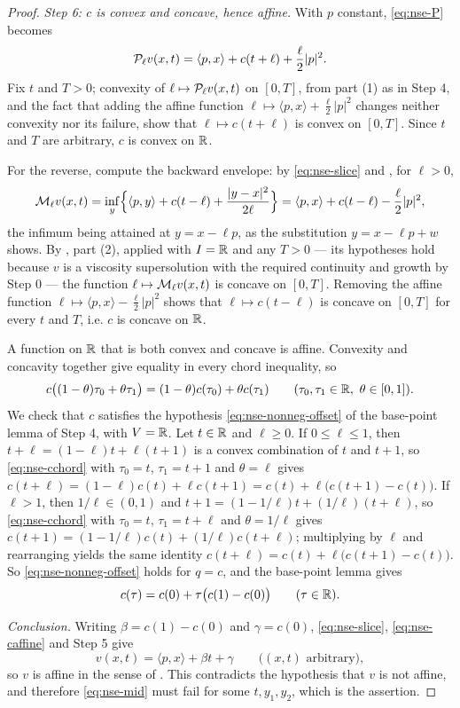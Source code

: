 \begin{proof}
\emph{Step 6: $c$ is convex and concave, hence affine.}
With $p$ constant, \eqref{eq:nse-P} becomes
\[
  \mathcal{P}_\ell v(x,t)=\langle p,x\rangle+c(t+\ell)+\frac{\ell}{2}|p|^2 .
\]
Fix $t$ and $T>0$; convexity of $\ell\mapsto\mathcal{P}_\ell v(x,t)$ on $[0,T]$, from
 part (1) as in Step 4, and the fact that adding the
affine function $\ell\mapsto\langle p,x\rangle+\tfrac\ell2|p|^2$ changes neither
convexity nor its failure, show that $\ell\mapsto c(t+\ell)$ is convex on
$[0,T]$. Since $t$ and $T$ are arbitrary, $c$ is convex on $\mathbb{R}$.

For the reverse, compute the backward envelope: by \eqref{eq:nse-slice} and
, for $\ell>0$,
\[
  \mathcal{M}_\ell v(x,t)
   =\inf_{y}\Bigl\{\langle p,y\rangle+c(t-\ell)+\frac{|y-x|^2}{2\ell}\Bigr\}
   =\langle p,x\rangle+c(t-\ell)-\frac{\ell}{2}|p|^2 ,
\]
the infimum being attained at $y=x-\ell p$, as the substitution
$y=x-\ell p+w$ shows. By , part (2), applied with
$I=\mathbb{R}$ and any $T>0$ — its hypotheses hold because $v$ is a viscosity
supersolution with the required continuity and growth by Step 0 — the function
$\ell\mapsto\mathcal{M}_\ell v(x,t)$ is concave on $[0,T]$. Removing the affine
function $\ell\mapsto\langle p,x\rangle-\tfrac\ell2|p|^2$ shows that
$\ell\mapsto c(t-\ell)$ is concave on $[0,T]$ for every $t$ and $T$, i.e. $c$ is
concave on $\mathbb{R}$.

A function on $\mathbb{R}$ that is both convex and concave is affine. Convexity and
concavity together give equality in every chord inequality, so
\begin{equation}\label{eq:nse-cchord}
  c\bigl((1-\theta)\tau_0+\theta\tau_1\bigr)
   =(1-\theta)c(\tau_0)+\theta c(\tau_1)
  \qquad(\tau_0,\tau_1\in\mathbb{R},\ \theta\in[0,1]).
\end{equation}
We check that $c$ satisfies the hypothesis \eqref{eq:nse-nonneg-offset} of the
base-point lemma of Step 4, with $V=\mathbb{R}$. Let $t\in\mathbb{R}$ and $\ell\ge0$. If
$0\le\ell\le1$, then $t+\ell=(1-\ell)t+\ell(t+1)$ is a convex combination of $t$
and $t+1$, so \eqref{eq:nse-cchord} with $\tau_0=t$, $\tau_1=t+1$ and
$\theta=\ell$ gives
$c(t+\ell)=(1-\ell)c(t)+\ell c(t+1)=c(t)+\ell\bigl(c(t+1)-c(t)\bigr)$. If
$\ell>1$, then $1/\ell\in(0,1)$ and $t+1=(1-1/\ell)t+(1/\ell)(t+\ell)$, so
\eqref{eq:nse-cchord} with $\tau_0=t$, $\tau_1=t+\ell$ and $\theta=1/\ell$ gives
$c(t+1)=(1-1/\ell)c(t)+(1/\ell)c(t+\ell)$; multiplying by $\ell$ and rearranging
yields the same identity $c(t+\ell)=c(t)+\ell\bigl(c(t+1)-c(t)\bigr)$. So
\eqref{eq:nse-nonneg-offset} holds for $q=c$, and the base-point lemma gives
\begin{equation}\label{eq:nse-caffine}
  c(\tau)=c(0)+\tau\bigl(c(1)-c(0)\bigr)\qquad(\tau\in\mathbb{R}).
\end{equation}

\emph{Conclusion.}
Writing $\beta=c(1)-c(0)$ and $\gamma=c(0)$, \eqref{eq:nse-slice},
\eqref{eq:nse-caffine} and Step 5 give
\[
  v(x,t)=\langle p,x\rangle+\beta t+\gamma\qquad\bigl((x,t)\text{ arbitrary}\bigr),
\]
so $v$ is affine in the sense of . This contradicts
the hypothesis that $v$ is not affine, and therefore
\eqref{eq:nse-mid} must fail for some $t,y_1,y_2$, which is the assertion.
\end{proof}
